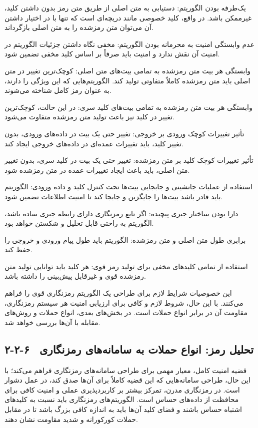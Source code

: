 یک‌طرفه بودن الگوریتم:
دستیابی به متن اصلی از طریق متن رمز بدون داشتن کلید، غیرممکن باشد. در واقع، کلید خصوصی مانند دریچه‌ای است که تنها با در اختیار داشتن آن می‌توان متن رمزشده را به متن اصلی بازگرداند.

عدم وابستگی امنیت به محرمانه بودن الگوریتم:
مخفی نگاه داشتن جزئیات الگوریتم در امنیت آن نقش ندارد و امنیت باید صرفاً بر اساس کلید مخفی تضمین شود.

وابستگی هر بیت متن رمزشده به تمامی بیت‌های متن اصلی:
کوچک‌ترین تغییر در متن اصلی باید متن رمزشده کاملاً متفاوتی تولید کند. الگوریتم‌هایی که این ویژگی را دارند، به عنوان رمز کامل شناخته می‌شوند.

وابستگی هر بیت متن رمزشده به تمامی بیت‌های کلید سری:
در این حالت، کوچک‌ترین تغییر در کلید نیز باعث تولید متن رمزشده متفاوت می‌شود.

تأثیر تغییرات کوچک ورودی بر خروجی:
تغییر حتی یک بیت در داده‌های ورودی، بدون تغییر کلید، باید تغییرات عمده‌ای در داده‌های خروجی ایجاد کند.

تأثیر تغییرات کوچک کلید بر متن رمزشده:
تغییر حتی یک بیت در کلید سری، بدون تغییر متن اصلی، باید باعث ایجاد تغییرات عمده در متن رمزشده شود.

استفاده از عملیات جانشینی و جابجایی بیت‌ها تحت کنترل کلید و داده ورودی:
الگوریتم باید قادر باشد بیت‌ها را جایگزین و جابجا کند تا امنیت اطلاعات تضمین شود.

دارا بودن ساختار جبری پیچیده:
اگر تابع رمزنگاری دارای رابطه جبری ساده باشد، الگوریتم به راحتی قابل تحلیل و شکستن خواهد بود.

برابری طول متن اصلی و متن رمزشده:
الگوریتم باید طول پیام ورودی و خروجی را حفظ کند.

استفاده از تمامی کلیدهای مخفی برای تولید رمز قوی:
هر کلید باید توانایی تولید متن رمزشده قوی و غیرقابل پیش‌بینی را داشته باشد.

این خصوصیات شرایط لازم برای طراحی یک الگوریتم رمزنگاری قوی را فراهم می‌کنند. با این حال، شروط لازم و کافی برای ارزیابی امنیت هر سیستم رمزنگاری، مقاومت آن در برابر انواع حملات است. در بخش‌های بعدی، انواع حملات و روش‌های مقابله با آن‌ها بررسی خواهد شد.

\subsection{۲-۲-۶  تحلیل رمز: انواع حملات به سامانه‌های رمزنگاری}

قضیه امنیت کامل، معیار مهمی برای طراحی سامانه‌های رمزنگاری فراهم می‌کند؛ با این حال، طراحی سامانه‌هایی که این قضیه کاملاً برای آن‌ها صدق کند، در عمل دشوار است. در رمزنگاری مدرن، تمرکز بیشتر بر کاربردپذیری عملی و امنیت کافی برای محافظت از داده‌های حساس است. الگوریتم‌های رمزنگاری باید نسبت به کلیدهای اشتباه حساس باشند و فضای کلید آن‌ها باید به اندازه کافی بزرگ باشد تا در مقابل حملات کورکورانه و شدید مقاومت نشان دهند\cite{ref32}.

